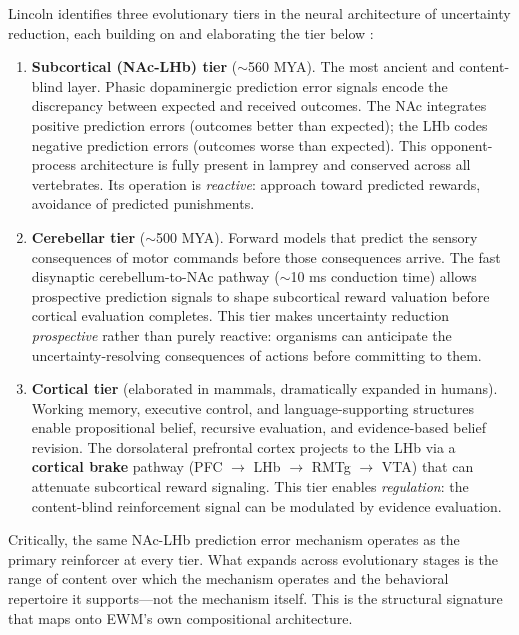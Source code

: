 \documentclass[11pt,a4paper]{article}
\theoremstyle{remark}
\begin{document}
Lincoln identifies three evolutionary tiers in the neural architecture of
uncertainty reduction, each building on and elaborating the tier below
\cite{lincoln2026}:

\begin{enumerate}[leftmargin=*,nosep]
  \item \textbf{Subcortical (NAc-LHb) tier} ($\sim$560 MYA). The most ancient
    and content-blind layer. Phasic dopaminergic prediction error signals encode
    the discrepancy between expected and received outcomes. The NAc integrates
    positive prediction errors (outcomes better than expected); the LHb codes
    negative prediction errors (outcomes worse than expected). This opponent-process
    architecture is fully present in lamprey and conserved across all vertebrates.
    Its operation is \textit{reactive}: approach toward predicted rewards,
    avoidance of predicted punishments.
  \item \textbf{Cerebellar tier} ($\sim$500 MYA). Forward models that predict
    the sensory consequences of motor commands before those consequences arrive.
    The fast disynaptic cerebellum-to-NAc pathway ($\sim$10 ms conduction time)
    allows prospective prediction signals to shape subcortical reward valuation
    before cortical evaluation completes. This tier makes uncertainty reduction
    \textit{prospective} rather than purely reactive: organisms can anticipate
    the uncertainty-resolving consequences of actions before committing to them.
  \item \textbf{Cortical tier} (elaborated in mammals, dramatically expanded in
    humans). Working memory, executive control, and language-supporting structures
    enable propositional belief, recursive evaluation, and evidence-based belief
    revision. The dorsolateral prefrontal cortex projects to the LHb via a
    \textbf{cortical brake} pathway (PFC $\to$ LHb $\to$ RMTg $\to$ VTA) that
    can attenuate subcortical reward signaling. This tier enables
    \textit{regulation}: the content-blind reinforcement signal can be
    modulated by evidence evaluation.
\end{enumerate}

Critically, the same NAc-LHb prediction error mechanism operates as the primary
reinforcer at every tier. What expands across evolutionary stages is the range
of content over which the mechanism operates and the behavioral repertoire it
supports---not the mechanism itself. This is the structural signature that maps
onto EWM's own compositional architecture.
\end{document}
